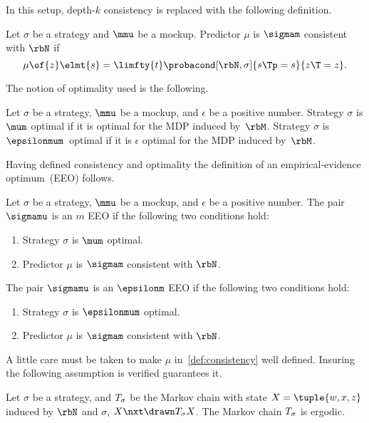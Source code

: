 In this setup, depth-\(k\) consistency is replaced with the following definition.
\begin{definition}
\label{def:consistency}
Let \(\sigma\) be a strategy and \(\mmu\) be a mockup.
Predictor \(\mu\) is \(\sigmam\) consistent with \(\rbN\) if
\[
\mu \of{z} \elmt{s} = \limfty{t}\probacond[\rbN, \sigma]{s\Tp = s}{z\T = z}.
\]
\end{definition}

The notion of optimality used is the following.
\begin{definition}
Let \(\sigma\) be a strategy, \(\mmu\) be a mockup, and \(\epsilon\) be a positive number.
Strategy \(\sigma\) is \(\mum\) optimal if it is optimal for the MDP induced by~\(\rbM\).
Strategy \(\sigma\) is \(\epsilonmum\)~optimal if it is \(\epsilon\) optimal for the MDP induced by~\(\rbM\).
\end{definition}

Having defined consistency and optimality the definition of an empirical-evidence optimum~(EEO) follows.
\begin{definition}
Let \(\sigma\) be a strategy, \(\mmu\) be a mockup, and \(\epsilon\) be a positive number.
The pair \(\sigmamu\) is an \(m\) EEO if the following two conditions hold:
\begin{enumerate}
\item Strategy \(\sigma\) is \(\mum\) optimal.
\item Predictor \(\mu\) is \(\sigmam\) consistent with \(\rbN\).
\end{enumerate}
The pair \(\sigmamu\) is an \(\epsilonm\) EEO if the following two conditions hold:
\begin{enumerate}
\item Strategy \(\sigma\) is \(\epsilonmum\) optimal.
\item Predictor \(\mu\) is \(\sigmam\) consistent with \(\rbN\).
\end{enumerate}
\end{definition}

A little care must be taken to make \(\mu\) in~\cref{def:consistency} well defined.
Insuring the following assumption is verified guarantees it.
\begin{assumption}
\label{ass:ergodicity}
Let \(\sigma\) be a strategy, and \(T_{\sigma}\) be the Markov chain with state \(X = \tuple{w, x, z}\) induced by \(\rbN\) and \(\sigma\), \(X\nxt \drawn T\strat{\sigma} X\).
The Markov chain \(T_{\sigma}\) is ergodic.
\end{assumption}

